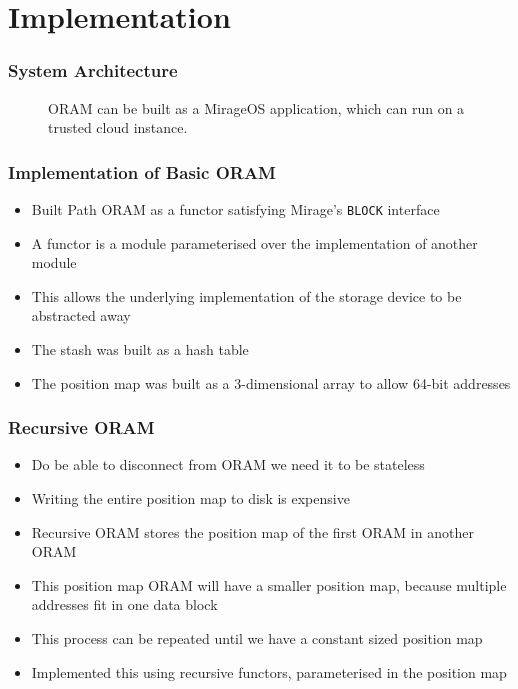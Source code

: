 \documentclass{beamer}
\begin{document}
\section{Implementation}

\begin{frame}
    \frametitle{System Architecture}
\begin{figure}
    \centering
    \caption{ORAM can be built as a MirageOS application, which can run on a trusted cloud instance.}
    \label{fig:cloudInstance}
\end{figure}
\end{frame}

\begin{frame}
    \frametitle{Implementation of Basic ORAM}
    \begin{itemize}
        \item Built Path ORAM as a functor satisfying Mirage's \texttt{BLOCK} interface
        \item A functor is a module parameterised over the implementation of another module
        \item This allows the underlying implementation of the storage device to be abstracted away
        \item The stash was built as a hash table
        \item The position map was built as a 3-dimensional array to allow 64-bit addresses
    \end{itemize}
\end{frame}

\begin{frame}
    \frametitle{Recursive ORAM}
    \begin{itemize}
        \item Do be able to disconnect from ORAM we need it to be stateless
        \item Writing the entire position map to disk is expensive
        \item Recursive ORAM stores the position map of the first ORAM in another ORAM
        \item This position map ORAM will have a smaller position map, because multiple addresses fit in one data block
        \item This process can be repeated until we have a constant sized position map
        \item Implemented this using recursive functors, parameterised in the position map
    \end{itemize}
\end{frame}
\end{document}
